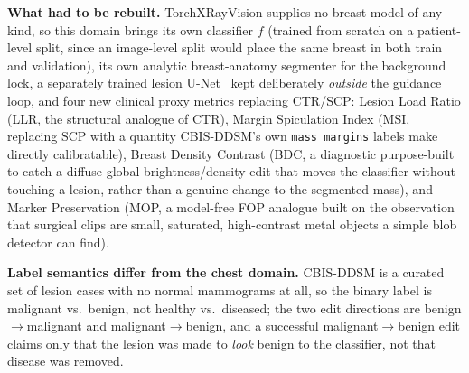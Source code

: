 \documentclass[11pt]{article}
\begin{document}
\textbf{What had to be rebuilt.} TorchXRayVision supplies no breast model
of any kind, so this domain brings its own classifier $f$ (trained from
scratch on a patient-level split, since an image-level split would place
the same breast in both train and validation), its own analytic
breast-anatomy segmenter for the background lock, a separately trained
lesion U-Net~\cite{ronneberger2015unet} kept deliberately \emph{outside}
the guidance loop, and four new clinical proxy metrics replacing CTR/SCP:
Lesion Load Ratio (LLR, the structural analogue of CTR), Margin
Spiculation Index (MSI, replacing SCP with a quantity CBIS-DDSM's own
\texttt{mass margins} labels make directly calibratable), Breast Density
Contrast (BDC, a diagnostic purpose-built to catch a diffuse global
brightness/density edit that moves the classifier without touching a
lesion, rather than a genuine change to the segmented mass), and Marker
Preservation (MOP, a model-free
FOP analogue built on the observation that surgical clips are small,
saturated, high-contrast metal objects a simple blob detector can find).

\textbf{Label semantics differ from the chest domain.} CBIS-DDSM is a
curated set of lesion cases with no normal mammograms at all, so the
binary label is malignant vs.\ benign, not healthy vs.\ diseased; the two
edit directions are benign$\to$malignant and malignant$\to$benign, and a
successful malignant$\to$benign edit claims only that the lesion was made
to \emph{look} benign to the classifier, not that disease was removed.
\end{document}
